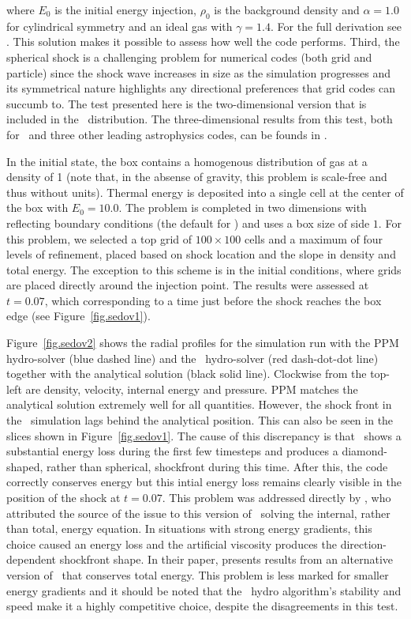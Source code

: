 \noindent where $E_0$ is the initial energy injection, $\rho_0$ is the
background density and $\alpha = 1.0$ for cylindrical symmetry and an
ideal gas with $\gamma = 1.4$. For the full derivation see
\citet{Sedov1959}. This solution makes it possible to assess how well
the code performs.  Third, the spherical shock is a challenging
problem for numerical codes (both grid and particle) since the shock
wave increases in size as the simulation progresses and its
symmetrical nature highlights any directional preferences that grid
codes can succumb to. The test presented here is the two-dimensional
version that is included in the \enzo\ distribution. The
three-dimensional results from this test, both for \enzo\ and three
other leading astrophysics codes, can be founds in \citet{Tasker2008}.

In the initial state, the box contains a homogenous distribution of
gas at a density of 1 (note that, in the absense of gravity, this
problem is scale-free and thus without units). Thermal energy is
deposited into a single cell at the center of the box with $E_0 =
10.0$. The problem is completed in two dimensions with reflecting
boundary conditions (the default for \enzo) and uses a box size of side
$1$. For this problem, we selected a top grid of $100 \times 100$
cells and a maximum of four levels of refinement, placed based on
shock location and the slope in density and total energy. The
exception to this scheme is in the initial conditions, where grids are
placed directly around the injection point. The results were assessed
at $t = 0.07$, which corresponding to a time just before the shock
reaches the box edge (see Figure~\ref{fig.sedov1}).

Figure~\ref{fig.sedov2} shows the radial profiles for the simulation
run with the PPM hydro-solver (blue dashed line) and the \zeus\
hydro-solver (red dash-dot-dot line) together with the analytical
solution (black solid line). Clockwise from the top-left are density,
velocity, internal energy and pressure. PPM matches the analytical
solution extremely well for all quantities. However, the shock front
in the \zeus\ simulation lags behind the analytical position. This can
also be seen in the slices shown in Figure~\ref{fig.sedov1}. The cause
of this discrepancy is that \zeus\ shows a substantial energy loss
during the first few timesteps and produces a diamond-shaped, rather
than spherical, shockfront during this time. After this, the code
correctly conserves energy but this intial energy loss remains clearly
visible in the position of the shock at $t = 0.07$. This problem was
addressed directly by \citet{Clarke2010}, who attributed the source of
the issue to this version of \zeus\ solving the internal, rather than
total, energy equation. In situations with strong energy gradients,
this choice caused an energy loss and the artificial viscosity
produces the direction-dependent shockfront shape. In their paper,
\citet{Clarke2010} presents results from an alternative version of
\zeus\ that conserves total energy. This problem is less marked for
smaller energy gradients and it should be noted that the \zeus\ hydro
algorithm's stability and speed make it a highly competitive choice,
despite the disagreements in this test.
